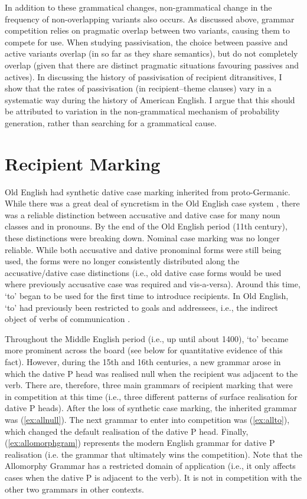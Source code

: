 	In addition to these grammatical changes, non-grammatical change in the frequency of non-overlapping variants also occurs. As discussed above, grammar competition relies on pragmatic overlap between two variants, causing them to compete for use. When studying passivisation, the choice between passive and active variants overlap (in so far as they share semantics), but do not completely overlap (given that there are distinct pragmatic situations favouring passives and actives). In discussing the history of passivisation of recipient ditransitives, I show that the rates of passivisation (in recipient--theme clauses) vary in a systematic way during the history of American English. I argue that this should be attributed to variation in the non-grammatical mechanism of probability generation, rather than searching for a grammatical cause.

\section{Recipient Marking}
	Old English had synthetic dative case marking inherited from proto-Germanic. While there was a great deal of syncretism in the Old English case system \citep{Allen.1999}, there was a reliable distinction between accusative and dative case for many noun classes and in pronouns. By the end of the Old English period (11th century), these distinctions were breaking down. Nominal case marking was no longer reliable. While both accusative and dative pronominal forms were still being used, the forms were no longer consistently distributed along the accusative/dative case distinctions (i.e., old dative case forms would be used where previously accusative case was required and vis-a-versa). Around this time, `to' began to be used for the first time to introduce recipients. In Old English, `to' had previously been restricted to goals and addressees, i.e., the indirect object of verbs of communication \citep{Allen.1999,McFadden.2002,OED.2013}. 

	Throughout the Middle English period (i.e., up until about 1400), `to' became more prominent across the board (see below for quantitative evidence of this fact). However, during the 15th and 16th centuries, a new grammar arose in which the dative P head was realised null when the recipient was adjacent to the verb. There are, therefore, three main grammars of recipient marking that were in competition at this time (i.e., three different patterns of surface realisation for dative P heads). After the loss of synthetic case marking, the inherited grammar was (\ref{ex:allnull}). The next grammar to enter into competition was (\ref{ex:allto}), which changed the default realisation of the dative P head. Finally, (\ref{ex:allomorphgram}) represents the modern English grammar for dative P realisation (i.e. the grammar that ultimately wins the competition). Note that the Allomorphy Grammar has a restricted domain of application (i.e., it only affects cases when the dative P is adjacent to the verb). It is not in competition with the other two grammars in other contexts.


